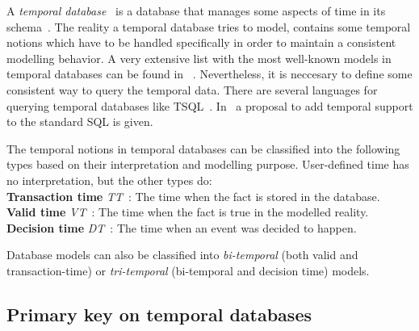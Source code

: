 %
%
A \emph{temporal database}~\cite{etzion1998} is a database that manages some aspects of time in its schema~\cite{Dyreson1994}. The reality a temporal database tries to model, contains some temporal notions which have to be handled specifically in order to maintain a consistent modelling behavior. A very extensive list with the most well-known models in temporal databases can be found in ~\cite{Yu1998}. Nevertheless, it is neccesary to define some consistent way to query the temporal data. There are several languages for querying temporal databases like TSQL~\cite{TSQL}. In~\cite{Snodgrass98} a proposal to add temporal support to the standard SQL is given.


\begin{svgraybox}
The temporal notions in temporal databases can be classified into the following types based on their interpretation and modelling purpose. User-defined time has no interpretation, but the other types do:\\

	\textbf{Transaction time} \emph{TT}~\cite{Jensen:1991:IIM:627283.627484}: The time when the fact is stored in the database.\\
	
	\textbf{Valid time} \emph{VT}~\cite{Snodgrass:1984:TQL:588011.588041}: The time when the fact is true in the modelled reality.\\
	
	\textbf{Decision time} \emph{DT}~\cite{Nascimento95}: The time when an event was decided to happen. \\
\end{svgraybox}
	
Database models can also be classified into \emph{bi-temporal} (both valid and transaction-time) or \emph{tri-temporal}  (bi-temporal and decision time) models.



\subsection{\label{subsubsec:primary-key}Primary key on temporal databases}

